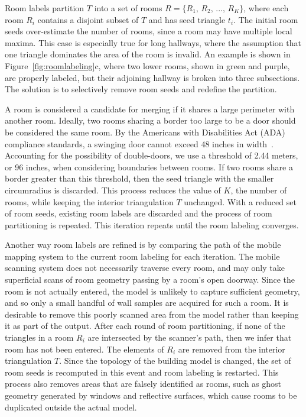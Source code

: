 \documentclass[12pt,onecolumn,oneside]{book}
\begin{document}

Room labels partition $T$ into a set of rooms $R = \{R_1,\,R_2,\,...,\,R_K\}$, where each room $R_i$ contains a disjoint subset of $T$ and has seed triangle $t_i$.  The initial room seeds over-estimate the number of rooms, since a room may have multiple local maxima.  This case is especially true for long hallways, where the assumption that one triangle dominates the area of the room is invalid.  An example is shown in Figure~\ref{fig:roomlabeling}c, where two lower rooms, shown in green and purple, are properly labeled, but their adjoining hallway is broken into three subsections.  The solution is to selectively remove room seeds and redefine the partition.

A room is considered a candidate for merging if it shares a large perimeter with another room.  Ideally, two rooms sharing a border too large to be a door should be considered the same room.  By the Americans with Disabilities Act (ADA) compliance standards, a swinging door cannot exceed 48 inches in width~\cite{ADACompliance}.  Accounting for the possibility of double-doors, we use a threshold of 2.44 meters, or 96 inches, when considering boundaries between rooms.  If two rooms share a border greater than this threshold, then the seed triangle with the smaller circumradius is discarded.  This process reduces the value of $K$, the number of rooms, while keeping the interior triangulation $T$ unchanged.  With a reduced set of room seeds, existing room labels are discarded and the process of room partitioning is repeated.  This iteration repeats until the room labeling converges.

Another way room labels are refined is by comparing the path of the mobile mapping system to the current room labeling for each iteration.  The mobile scanning system does not necessarily traverse every room, and may only take superficial scans of room geometry passing by a room's open doorway.  Since the room is not actually entered, the model is unlikely to capture sufficient geometry, and so only a small handful of wall samples are acquired for such a room.  It is desirable to remove this poorly scanned area from the model rather than keeping it as part of the output.  After each round of room partitioning, if none of the triangles in a room $R_i$ are intersected by the scanner's path, then we infer that room has not been entered.  The elements of $R_i$ are removed from the interior triangulation $T$.  Since the topology of the building model is changed, the set of room seeds is recomputed in this event and room labeling is restarted.  This process also removes areas that are falsely identified as rooms, such as ghost geometry generated by windows and reflective surfaces, which cause rooms to be duplicated outside the actual model.
\end{document}
